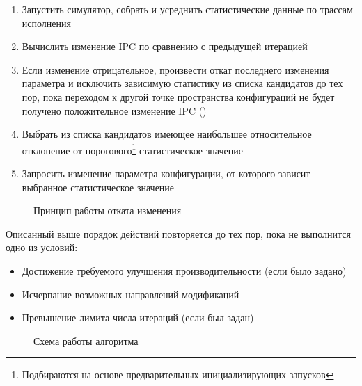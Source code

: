 \begin{enumerate}
  \item Запустить симулятор, собрать и усреднить статистические данные по трассам исполнения
  \item Вычислить  изменение IPC по сравнению с предыдущей итерацией
  \item Если изменение отрицательное, произвести откат последнего изменения параметра и исключить зависимую статистику из списка кандидатов до тех пор, пока переходом к другой точке пространства конфигураций не будет получено положительное изменение IPC ()
  \item Выбрать из списка кандидатов имеющее наибольшее относительное отклонение от порогового\footnote{Подбираются на основе предварительных инициализирующих запусков} статистическое значение
  \item Запросить изменение параметра конфигурации, от которого зависит выбранное статистическое значение
\end{enumerate}

\begin{figure}[!htbp]
  \centering
  \caption{Принцип работы отката изменения}
  \label{fig:rollback}
\end{figure}

Описанный выше порядок действий повторяется до тех пор, пока не выполнится одно из условий:
\begin{itemize}
  \item Достижение требуемого улучшения производительности (если было задано)
  \item Исчерпание возможных направлений модификаций
  \item Превышение лимита числа итераций (если был задан)
\end{itemize}

\begin{figure}[!htbp]
  \centering
  \scalebox{0.862}{
    
  }
  \caption{Схема работы алгоритма}
\end{figure}



